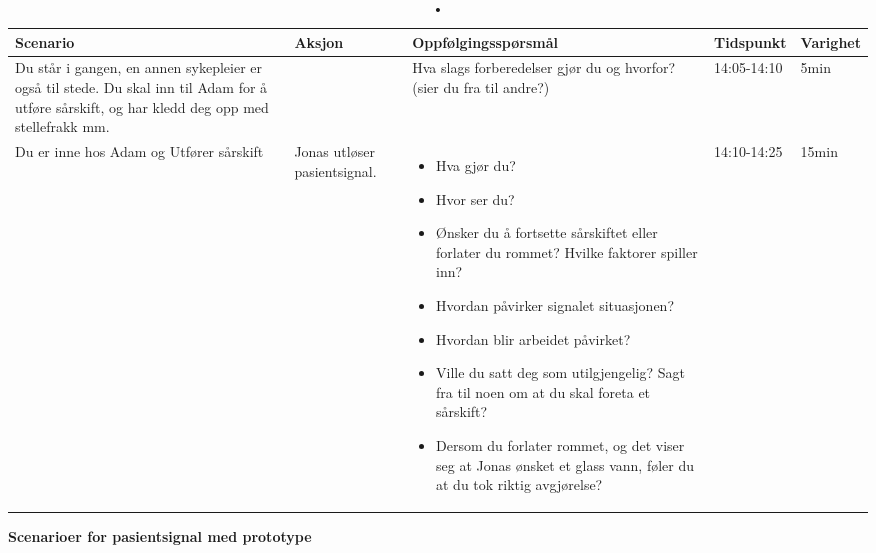 \begin{table}[H]
\small
\caption{•}
\begin{tabular}{p{3cm}|p{2cm}|p{4cm}|l|l}
\hline
\textbf{Scenario} & \textbf{Aksjon} & \textbf{Oppfølgingsspørsmål} & \textbf{Tidspunkt} & \textbf{Varighet}\\
\hline
Du står i gangen, en annen sykepleier er også til stede. Du skal inn til Adam for å utføre sårskift, og har kledd deg opp med stellefrakk  mm. & & Hva slags forberedelser gjør du og hvorfor? (sier du fra til andre?)
& 14:05-14:10 & 5min\\
\hline
Du er inne hos Adam og Utfører sårskift & Jonas utløser pasientsignal. & 
\begin{itemize}
\item Hva gjør du?
\item Hvor ser du?
\item Ønsker du å fortsette sårskiftet eller forlater du rommet? Hvilke faktorer spiller inn?
\item Hvordan påvirker signalet situasjonen?
\item Hvordan blir arbeidet påvirket?
\item Ville du satt deg som utilgjengelig? Sagt fra til noen om at du skal foreta et sårskift?
\item Dersom du forlater rommet, og det viser seg at Jonas ønsket et glass vann, føler du at du tok riktig avgjørelse?
\end{itemize}
 & 14:10-14:25 & 15min\\
\end{tabular}
\label{Steg3.2}
\end{table}

\pagebreak
\textbf{Scenarioer for pasientsignal med prototype}

